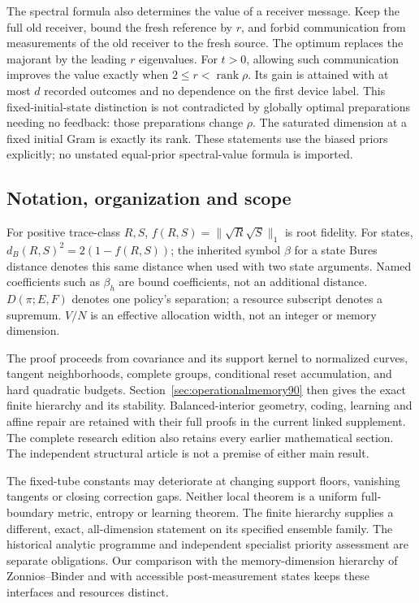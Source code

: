 The spectral formula also determines the value of a receiver message.
Keep the full old receiver, bound the fresh reference by $r$, and forbid
communication from measurements of the old receiver to the fresh source.
The optimum replaces the majorant by the leading $r$ eigenvalues.
For $t>0$, allowing such communication improves the value exactly when
$2\le r<\operatorname{rank}\rho$.  Its gain is attained with at most
$d$ recorded outcomes and no dependence on the first device label.
This fixed-initial-state distinction is not contradicted by globally
optimal preparations needing no feedback: those preparations change
$\rho$.  The saturated dimension at a fixed initial Gram is exactly its
rank.  These statements use the biased priors explicitly; no unstated
equal-prior spectral-value formula is imported.

\subsection{Notation, organization and scope}
For positive trace-class $R,S$, $f(R,S)=\|\sqrt R\sqrt S\|_1$ is root
fidelity.  For states, $d_B(R,S)^2=2(1-f(R,S))$; the inherited symbol
$\beta$ for a state Bures distance denotes this same distance when used
with two state arguments.  Named coefficients such as $\beta_h$ are
bound coefficients, not an additional distance.  $D(\pi;E,F)$ denotes
one policy's separation; a resource subscript denotes a supremum.
$V/N$ is an effective allocation width, not an integer or memory dimension.

The proof proceeds from covariance and its support kernel to normalized
curves, tangent neighborhoods, complete groups, conditional reset
accumulation, and hard quadratic budgets.  Section~\ref{sec:operationalmemory90}
then gives the exact finite hierarchy and its stability.  Balanced-interior
geometry, coding, learning and affine repair are retained with their full
proofs in the current linked supplement.  The complete research edition
also retains every earlier mathematical section.  The independent
structural article is not a premise of either main result.

The fixed-tube constants may deteriorate at changing support floors,
vanishing tangents or closing correction gaps.  Neither local theorem
is a uniform full-boundary metric, entropy or learning theorem.  The
finite hierarchy supplies a different, exact, all-dimension statement on
its specified ensemble family.  The historical analytic programme and
independent specialist priority assessment are separate obligations.
Our comparison with the memory-dimension hierarchy of Zonnios--Binder
\cite{ZB90} and with accessible post-measurement states \cite{EQ90}
keeps these interfaces and resources distinct.
